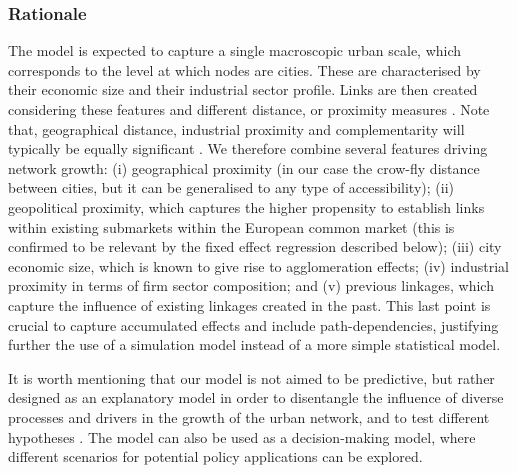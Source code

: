 \documentclass[10pt,letterpaper]{article}
\begin{document}
\subsubsection*{Rationale}
The model is expected to capture a single macroscopic urban scale, which corresponds to the level at which nodes are cities. These are characterised by their economic size and their industrial sector profile. %
Links are then created considering these features and different distance, or proximity measures \cite{martinus2018global}. 
Note that, geographical distance, industrial proximity and complementarity will typically be equally significant \cite{cottineau2020nested}. 
We therefore combine several features driving network growth: (i) geographical proximity (in our case the crow-fly distance between cities, but it can be generalised to any type of accessibility); (ii) geopolitical proximity, which captures the higher propensity to establish links within existing submarkets within the European common market (this is confirmed to be  relevant by the fixed effect regression described below); (iii) city economic size, which is known to give rise to agglomeration effects; (iv) industrial proximity in terms of firm sector composition; and (v) previous linkages, which capture the influence of existing linkages created in the past. This last point is crucial to capture accumulated effects and include path-dependencies, justifying further the use of a simulation model instead of a more simple statistical model.

It is worth mentioning that our model is not aimed to be predictive, but rather designed as an explanatory model in order to disentangle the influence of diverse processes and drivers in the growth of the urban network, and to test different hypotheses \cite{conte2012manifesto,varenne2018models}. 
The model can also be used as a decision-making model, where different scenarios for potential policy applications can be explored. 
\end{document}
